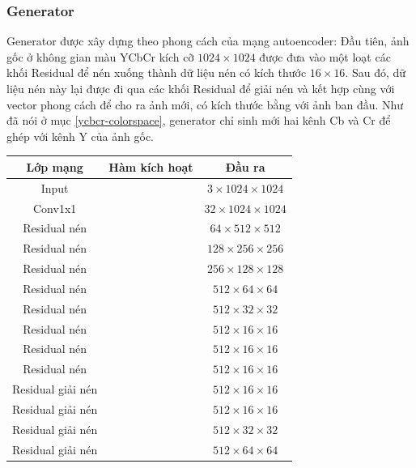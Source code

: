 \documentclass[12pt]{extreport}
\begin{document}
\subsubsection{Generator}

Generator được xây dựng theo phong cách của mạng autoencoder: Đầu tiên, ảnh gốc ở không gian màu YCbCr kích cỡ $ 1024 \times 1024 $ được đưa vào một loạt các khối Residual để nén xuống thành dữ liệu nén có kích thước $ 16 \times 16 $. Sau đó, dữ liệu nén này lại được đi qua các khối Residual để giải nén và kết hợp cùng với vector phong cách để cho ra ảnh mới, có kích thước bằng với ảnh ban đầu. Như đã nói ở mục \ref{ycbcr-colorspace}, generator chỉ sinh mới hai kênh Cb và Cr để ghép với kênh Y của ảnh gốc.

\begin{table}[H]
    \centering
    \begin{tabular}{c c c}
        Lớp mạng          & Hàm kích hoạt & Đầu ra                         \\
        \hline
        Input             &               & $ 3 \times 1024 \times 1024 $  \\
        Conv1x1           &               & $ 32 \times 1024 \times 1024 $ \\
        Residual nén      &               & $ 64 \times 512 \times 512 $   \\
        Residual nén      &               & $ 128 \times 256 \times 256 $  \\
        Residual nén      &               & $ 256 \times 128 \times 128 $  \\
        Residual nén      &               & $ 512 \times 64 \times 64 $    \\
        Residual nén      &               & $ 512 \times 32 \times 32 $    \\
        Residual nén      &               & $ 512 \times 16 \times 16 $    \\
        Residual nén      &               & $ 512 \times 16 \times 16 $    \\
        Residual nén      &               & $ 512 \times 16 \times 16 $    \\
        Residual giải nén &               & $ 512 \times 16 \times 16 $    \\
        Residual giải nén &               & $ 512 \times 16 \times 16 $    \\
        Residual giải nén &               & $ 512 \times 32 \times 32 $    \\
        Residual giải nén &               & $ 512 \times 64 \times 64 $    \\

\end{tabular}
\end{table}
\end{document}

